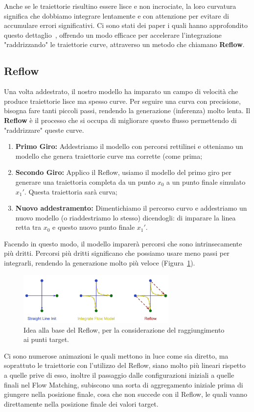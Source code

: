 Anche se le traiettorie risultino essere lisce e non incrociate, la loro curvatura significa che dobbiamo integrare lentamente e con attenzione per evitare di accumulare errori significativi. Ci sono stati dei paper i quali hanno approfondito questo dettaglio~\cite{lipman2023flow}, offrendo un modo efficace per accelerare l'integrazione "raddrizzando" le traiettorie curve, attraverso un metodo che chiamano \textbf{Reflow}.

\subsection{Reflow}

Una volta addestrato, il nostro modello ha imparato un campo di velocità che produce traiettorie lisce ma spesso curve. Per seguire una curva con precisione, bisogna fare tanti piccoli passi, rendendo la generazione (inferenza) molto lenta. Il \textbf{Reflow} è il processo che si occupa di migliorare questo flusso permettendo di "raddrizzare" queste curve.

\begin{enumerate}
    \item \textbf{Primo Giro:} Addestriamo il modello con percorsi rettilinei e otteniamo un modello che genera traiettorie curve ma corrette (come prima;
    \item \textbf{Secondo Giro:} Applico il Reflow, usiamo il modello del primo giro per generare una traiettoria completa da un punto $x_0$ a un punto finale simulato $x_1'$. Questa traiettoria sarà curva;
    \item \textbf{Nuovo addestramento:} Dimentichiamo il percorso curvo e addestriamo un nuovo modello (o riaddestriamo lo stesso) dicendogli: di imparare la linea retta tra $x_0$ e questo nuovo punto finale $x_1'$.
\end{enumerate}

Facendo in questo modo, il modello imparerà percorsi che sono intrinsecamente più dritti. Percorsi più dritti significano che possiamo usare meno passi per integrarli, rendendo la generazione molto più veloce (Figura~\ref{fig:reflow}).
\begin{figure}
    \centering
    \includegraphics[width=0.7\textwidth]{figure/Reflow}
    \caption{Idea alla base del Reflow, per la considerazione del raggiungimento ai punti target.}
    \label{fig:reflow}
\end{figure}
Ci sono numerose animazioni le quali mettono in luce come sia diretto, ma soprattuto le traiettorie con l'utilizzo del Reflow, siano molto più lineari rispetto a quelle prive di esso, inoltre il passaggio dalle configurazioni iniziali a quelle finali nel Flow Matching, subiscono una sorta di aggregamento iniziale prima di giungere nella posizione finale, cosa che non succede con il Reflow, le quali vanno direttamente nella posizione finale dei valori target.

